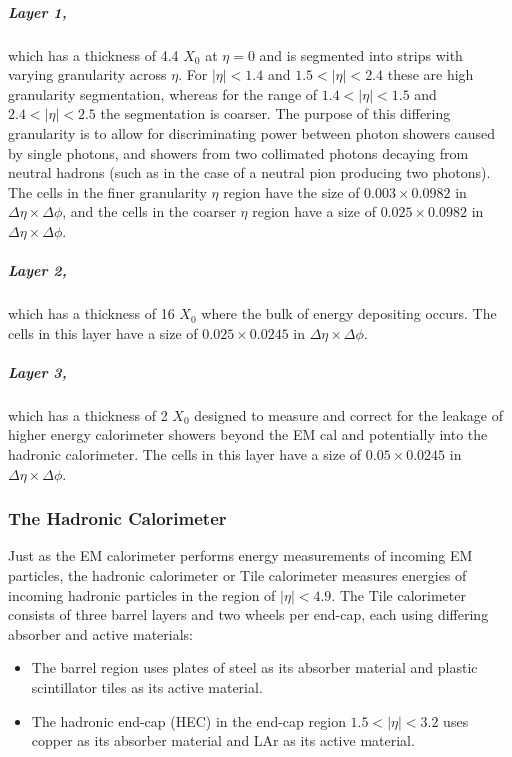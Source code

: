 \documentclass[12pt,a4paper,epsf,portrait,times,epsfig]{report}
\begin{document}
		\subparagraph{Layer 1,} which has a thickness of 4.4 $X_{0}$ at $\eta = 0$ and is segmented into strips with varying granularity across $\eta$. For $|\eta| < 1.4$ and $1.5 < |\eta| < 2.4$ these are high granularity segmentation, whereas for the range of $1.4 < |\eta| < 1.5$ and $2.4 < |\eta| < 2.5$ the segmentation is coarser. The purpose of this differing granularity is to allow for discriminating power between photon showers caused by single photons, and showers from two collimated photons decaying from neutral hadrons (such as in the case of a neutral pion producing two photons). The cells in the finer granularity $\eta$ region have the size of $0.003 \times 0.0982$ in $\Delta\eta \times \Delta\phi$, and the cells in the coarser $\eta$ region have a size of $0.025 \times 0.0982$ in $\Delta\eta \times \Delta\phi$. 
		
		\subparagraph{Layer 2,} which has a thickness of 16 $X_{0}$ where the bulk of energy depositing occurs. The cells in this layer have a size of $0.025 \times 0.0245$ in $\Delta\eta \times \Delta\phi$. 
		
		\subparagraph{Layer 3,} which has a thickness of 2 $X_{0}$ designed to measure and correct for the leakage of higher energy calorimeter showers beyond the EM cal and potentially into the hadronic calorimeter. The cells in this layer have a size of $0.05 \times 0.0245$ in $\Delta\eta \times \Delta\phi$. 
		
		\subsubsection{The Hadronic Calorimeter}\label{Section:HCal}

		Just as the EM calorimeter performs energy measurements of incoming EM particles, the hadronic calorimeter or Tile calorimeter \cite{ATLASTileTDR} measures energies of incoming hadronic particles in the region of $|\eta| < 4.9$. The Tile calorimeter consists of three barrel layers and two wheels per end-cap, each using differing absorber and active materials:
		
		\begin{itemize}
			\item The barrel region uses plates of steel as its absorber material and plastic scintillator tiles as its active material.
			\item The hadronic end-cap (HEC) in the end-cap region $1.5 < |\eta| < 3.2$ uses copper as its absorber material and LAr as its active material. 
		\end{itemize}
\end{document}
